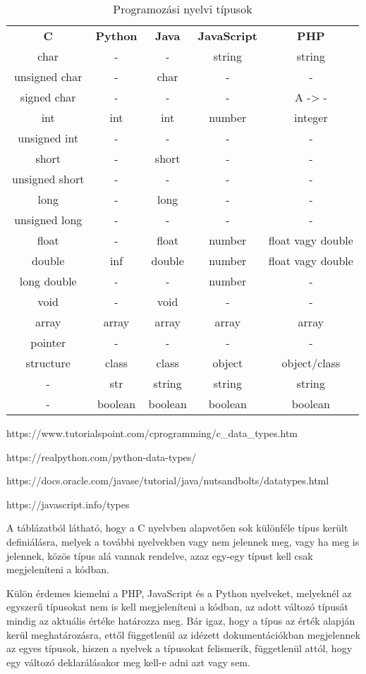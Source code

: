 \begin{table}
	\caption{Programozási nyelvi típusok}
	\label{2. táblázat}
	\begin{tabular}{c|c|c|c|c}
		\textbf{C} & \textbf{Python} & \textbf{Java} & \textbf{JavaScript} & \textbf{PHP}\\
		char & - & - & string & string \\
		unsigned char & - & char & - & - \\
		signed char & - & - & - & A -> - \\
		int & int & int & number & integer \\
		unsigned int & - & - & - & - \\
		short & - & short & - & - \\
		unsigned short & - & - & - & - \\
		long & - & long & - & - \\
		unsigned long & - & - & - & - \\
		float & - & float & number & float vagy double \\
		double & inf & double & number & float vagy double \\
		long double & - & - & number & - \\
		void & - & void & - & - \\
		array & array & array & array & array \\
		pointer & - & - & - & - \\
		structure & class & class & object & object/class \\
		- & str & string & string & string \\
		- & boolean & boolean & boolean & boolean \\
	\end{tabular}
\end{table}

https://www.tutorialspoint.com/cprogramming/c\_data\_types.htm

https://realpython.com/python-data-types/

https://docs.oracle.com/javase/tutorial/java/nutsandbolts/datatypes.html

https://javascript.info/types

A táblázatból látható, hogy a C nyelvben alapvetően sok különféle típus került definiálásra, melyek a további nyelvekben vagy nem jelennek meg, vagy ha meg is jelennek, közös típus alá vannak rendelve, azaz egy-egy típust kell csak megjeleníteni a kódban.

Külön érdemes kiemelni a PHP, JavaScript és a Python nyelveket, melyeknél az egyszerű típusokat nem is kell megjeleníteni a kódban, az adott változó típusát mindig az aktuális értéke határozza meg. Bár igaz, hogy a típus az érték alapján kerül meghatározásra, ettől függetlenül az idézett dokumentációkban megjelennek az egyes típusok, hiszen a nyelvek a típusokat felismerik, függetlenül attól, hogy egy változó deklarálásakor meg kell-e adni azt vagy sem.

